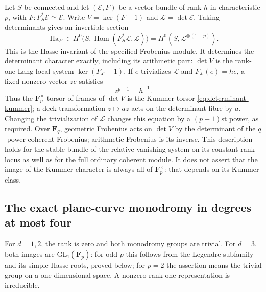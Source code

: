Let $S$ be connected and let $(\mathcal E,F)$ be a vector bundle of
rank $h$ in characteristic $p$, with $F:F_S^*\mathcal E\simeq\mathcal E$.
Write $V=\ker(F-1)$ and $\mathcal L=\det\mathcal E$.  Taking
determinants gives an invertible section
\[
 \operatorname{Ha}_F\in
 H^0\bigl(S,\operatorname{Hom}(F_S^*\mathcal L,\mathcal L)\bigr)
 =H^0(S,\mathcal L^{\otimes(1-p)}).
\]
This is the Hasse invariant of the specified Frobenius module.  It
determines the determinant character exactly, including its arithmetic
part: $\det V$ is the rank-one Lang local system
$\ker(F_{\mathcal L}-1)$.  If $e$ trivializes $\mathcal L$ and
$F_{\mathcal L}(e)=h e$, a fixed nonzero vector $ze$ satisfies
\begin{equation}\label{eq:determinant-kummer}
 z^{p-1}=h^{-1}.
\end{equation}
Thus the $\mathbf F_p^\times$-torsor of frames of $\det V$ is the
Kummer torsor \eqref{eq:determinant-kummer}; a deck transformation
$z\mapsto az$ acts on the determinant fibre by $a$.  Changing the
trivialization of $\mathcal L$ changes this equation by a
$(p-1)$st power, as required.  Over $\mathbf F_q$, geometric Frobenius
acts on $\det V$ by the determinant of the $q$-power coherent
Frobenius; arithmetic Frobenius is its inverse.  This description
holds for the stable bundle of the relative vanishing system on its
constant-rank locus as well as for the full ordinary coherent module.
It does not assert that the image of the Kummer character is always
all of $\mathbf F_p^\times$: that depends on its Kummer class.

\subsection{The exact plane-curve monodromy in degrees at most four}
\label{subsec:small-plane-monodromy}

For $d=1,2$, the rank is zero and both monodromy groups are trivial.
For $d=3$, both images are $\mathrm{GL}_1(\mathbf F_p)$: for odd $p$
this follows from the Legendre subfamily and its simple Hasse roots,
proved below; for $p=2$ the assertion means the trivial group on a
one-dimensional space.  A nonzero rank-one representation is
irreducible.

